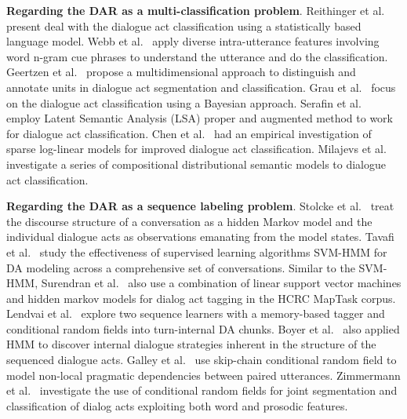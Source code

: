 \documentclass[sigconf]{acmart}
\begin{document}
\textbf{Regarding the DAR as a multi-classification problem}.  Reithinger et al.~\cite{reithinger1997dialogue} present deal with the dialogue act classification using a statistically based language model. Webb et al.~\cite{webb2005dialogue} apply diverse intra-utterance features involving word n-gram cue phrases to understand the utterance and do the classification. Geertzen et al.~\cite{geertzen2007multidimensional} propose a multidimensional approach to distinguish and annotate units in dialogue act segmentation and classification. Grau et al.~\cite{grau2004dialogue} focus on the dialogue act classification using a Bayesian approach. Serafin et al.~\cite{serafin2003latent} employ Latent Semantic Analysis (LSA) proper and augmented method to work for dialogue act classification. Chen et al.~\cite{chen2013empirical} had an empirical investigation of sparse log-linear models for improved dialogue act classification. Milajevs et al.~\cite{milajevs2014investigating} investigate a series of compositional distributional semantic models to dialogue act classification. 

\textbf{Regarding the DAR as a sequence labeling problem}. 
Stolcke et al.~\cite{stolcke2006dialogue} treat the discourse structure of a conversation as a hidden Markov model and the individual dialogue acts as observations emanating from the model states. Tavafi et al.~\cite{tavafidialogue} study the effectiveness of supervised learning algorithms SVM-HMM for DA modeling across a comprehensive set of conversations. Similar to the SVM-HMM, Surendran et al.~\cite{surendran2006dialog} also use a combination of linear support vector machines and hidden markov models for dialog act tagging in the HCRC MapTask corpus. Lendvai et al.~\cite{lendvai2007token} explore two sequence learners with a memory-based tagger and conditional random fields into turn-internal DA chunks. Boyer et al.~\cite{boyer2009discovering} also applied HMM to discover internal dialogue strategies inherent in the structure of the sequenced dialogue acts.  Galley et al.~\cite{galley2006skip} use skip-chain conditional random field to model non-local pragmatic dependencies between paired utterances. Zimmermann et al.~\cite{zimmermann2009joint} investigate the use of conditional random fields for
joint segmentation and classification of dialog acts exploiting both word and prosodic features.   
\end{document}
